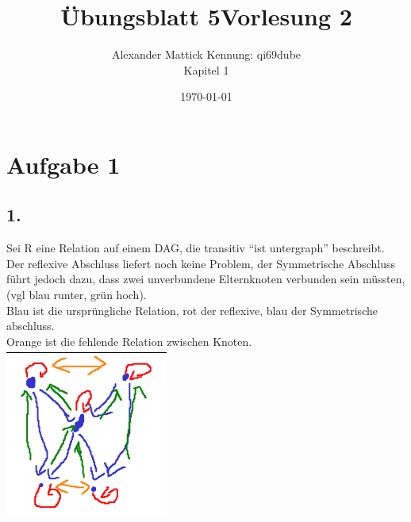 \documentclass{article}
\title{Übungsblatt 5}
\author{
Alexander Mattick Kennung: qi69dube\\
Kapitel 1
}
\date{\today}
\title{Vorlesung 2}
\begin{document}
	\maketitle
	\section{Aufgabe 1}
	\subsection{1.}
	Sei R eine Relation auf einem DAG, die transitiv ``ist untergraph'' beschreibt.\\
	Der reflexive Abschluss liefert noch keine Problem, der Symmetrische Abschluss führt jedoch dazu, dass zwei unverbundene Elternknoten verbunden sein müssten, (vgl blau runter, grün hoch).\\
	Blau ist die ursprüngliche Relation, rot der reflexive, blau der Symmetrische abschluss.\\
	Orange ist die fehlende Relation zwischen Knoten.\\
	\includegraphics{Relation.png}\\
\end{document}
